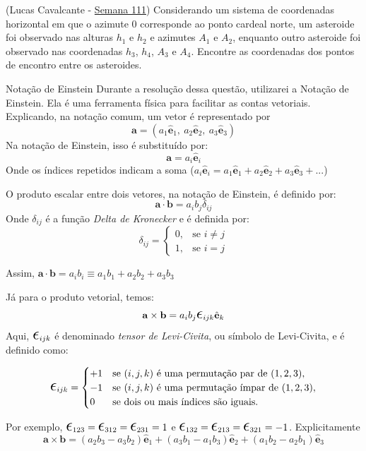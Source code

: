 \documentclass[11pt]{article}
\begin{document}
\begin{pproblem}(Lucas Cavalcante - \href{https://noic.com.br/olimpiadas/astronomia/problemas-da-semana/astronomia-semana-111/}{Semana 111})
    Considerando um sistema de coordenadas horizontal em que o azimute \(0\) corresponde ao ponto cardeal norte, um asteroide foi observado nas alturas \(h_1\) e \(h_2\) e azimutes \(A_1\) e \(A_2\), enquanto outro asteroide foi observado nas coordenadas \(h_3\), \(h_4\), \(A_3\) e \(A_4\). Encontre as coordenadas dos pontos de encontro entre os asteroides.
    
    \begin{psidea}{Notação de Einstein}{}
    Durante a resolução dessa questão, utilizarei a Notação de Einstein. Ela é uma ferramenta física para facilitar as contas vetoriais. Explicando, na notação comum, um vetor é representado por
    \[\mathbf{a} = (a_1 \hat{\mathbf{e}}_1, \ a_2 \hat{\mathbf{e}}_2, \ a_3 \hat{\mathbf{e}}_3)\]
    Na notação de Einstein, isso é substituído por:
    \[\mathbf{a} = a_i \hat{\mathbf{e}}_i\]
    Onde os índices repetidos indicam a soma (\(a_i \hat{\mathbf{e}}_i = a_1 \hat{\mathbf{e}}_1 + a_2 \hat{\mathbf{e}}_2 + a_3 \hat{\mathbf{e}}_3 + ...\))
    
    O produto escalar entre dois vetores, na notação de Einstein, é definido por:
    \[\mathbf{a}\cdot \mathbf{b} = a_i b_j \delta_{ij}\]
    Onde \(\delta_{ij}\) é a função \textit{Delta de Kronecker} e é definida por:
    \[\delta_{ij} = \left \{ \begin{matrix} 0, & \mbox{se } i \ne j \\ 
                                            1, & \mbox{se } i = j\end{matrix} \right.\]
    
    Assim, \(\mathbf{a}\cdot \mathbf{b} = a_i b_i \equiv a_1 b_1 + a_2 b_2 + a_3 b_3\)

    Já para o produto vetorial, temos:
        \[
        \mathbf{a} \times \mathbf{b} = a_i b_j \Epsilon_{ijk} \hat{\mathbf{e}}_k
        \]
        Aqui, \(\Epsilon_{ijk}\) é denominado \textit{tensor de Levi-Civita}, ou símbolo de Levi-Civita, e é definido como:
    
        \[
        \Epsilon_{ijk} = 
        \begin{cases} 
        +1 & \text{se } (i, j, k) \text{ é uma permutação par de } (1, 2, 3), \\
        -1 & \text{se } (i, j, k) \text{ é uma permutação ímpar de } (1, 2, 3), \\
        0 & \text{se dois ou mais índices são iguais}.
        \end{cases}
        \]

        Por exemplo, \(\Epsilon_{123} = \Epsilon_{312} = \Epsilon_{231} = 1\) e \(\Epsilon_{132} = \Epsilon_{213} = \Epsilon_{321} = -1\).
        Explicitamente 
        \[\mathbf{a} \times \mathbf{b} = (a_2 b_3 - a_3 b_2) \hat{\mathbf{e}}_1 + (a_3 b_1 - a_1 b_3) \hat{\mathbf{e}}_2 + (a_1 b_2 - a_2 b_1) \hat{\mathbf{e}}_3\]
    \end{psidea}
\end{pproblem}
\end{document}
